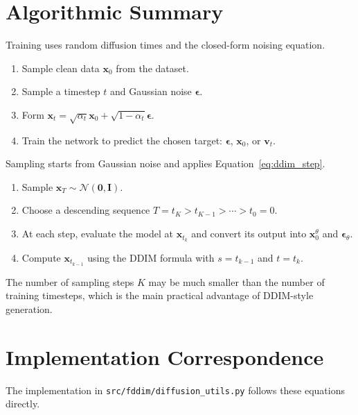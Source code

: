 \documentclass[11pt]{article}
\newcommand{\bx}{\mathbf{x}}
\newcommand{\bv}{\mathbf{v}}
\newcommand{\beps}{\boldsymbol{\epsilon}}
\newcommand{\bI}{\mathbf{I}}
\newcommand{\N}{\mathcal{N}}
\begin{document}
\section{Algorithmic Summary}

Training uses random diffusion times and the closed-form noising equation.
\begin{enumerate}
  \item Sample clean data $\bx_0$ from the dataset.
  \item Sample a timestep $t$ and Gaussian noise $\beps$.
  \item Form $\bx_t=\sqrt{\alpha_t}\bx_0+\sqrt{1-\alpha_t}\beps$.
  \item Train the network to predict the chosen target: $\beps$, $\bx_0$, or $\bv_t$.
\end{enumerate}

Sampling starts from Gaussian noise and applies Equation~\eqref{eq:ddim_step}.
\begin{enumerate}
  \item Sample $\bx_T\sim\N(\mathbf{0},\bI)$.
  \item Choose a descending sequence $T=t_K>t_{K-1}>\cdots>t_0=0$.
  \item At each step, evaluate the model at $\bx_{t_k}$ and convert its output into
        $\bx_0^\theta$ and $\beps_\theta$.
  \item Compute $\bx_{t_{k-1}}$ using the DDIM formula with $s=t_{k-1}$ and $t=t_k$.
\end{enumerate}
The number of sampling steps $K$ may be much smaller than the number of training timesteps, which is the
main practical advantage of DDIM-style generation.

\section{Implementation Correspondence}

The implementation in \texttt{src/fddim/diffusion\_utils.py} follows these equations directly.
\end{document}

